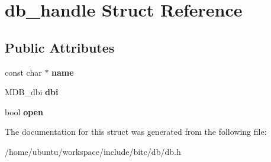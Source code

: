 \hypertarget{structdb__handle}{\section{db\-\_\-handle Struct Reference}
\label{structdb__handle}
}
\subsection*{Public Attributes}
\begin{DoxyCompactItemize}
\item 
\hypertarget{structdb__handle_aef0bba6f556a1901938ec0f4d8a35e6a}{const char $\ast$ {\bfseries name}}\label{structdb__handle_aef0bba6f556a1901938ec0f4d8a35e6a}

\item 
\hypertarget{structdb__handle_ad6391bf79fc583db85fdc4449d81a0df}{M\-D\-B\-\_\-dbi {\bfseries dbi}}\label{structdb__handle_ad6391bf79fc583db85fdc4449d81a0df}

\item 
\hypertarget{structdb__handle_a875f2dac1ffc68965a381567a86737fa}{bool {\bfseries open}}\label{structdb__handle_a875f2dac1ffc68965a381567a86737fa}

\end{DoxyCompactItemize}


The documentation for this struct was generated from the following file\-:\begin{DoxyCompactItemize}
\item 
/home/ubuntu/workspace/include/bitc/db/db.\-h\end{DoxyCompactItemize}
